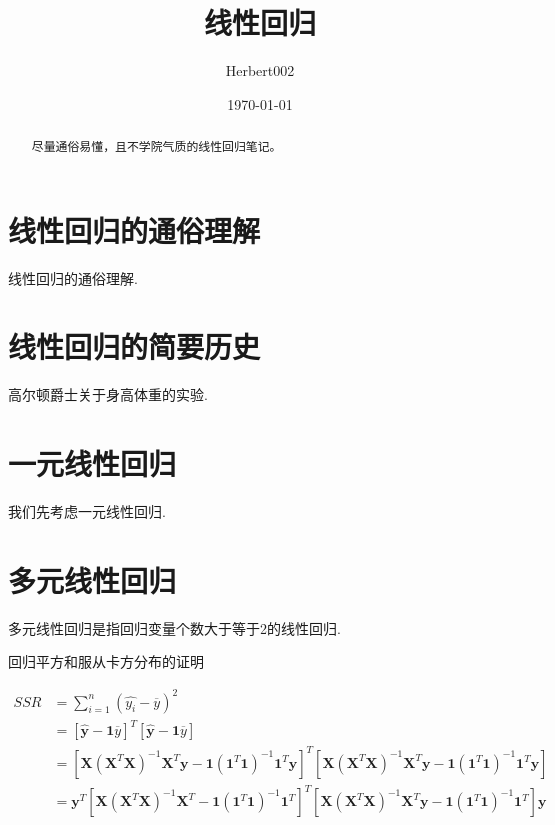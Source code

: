 \documentclass[UTF8]{ctexart}
\title{\heiti 线性回归}
\author{\kaishu Herbert002}
\date{\today}
\begin{document}
	
	\maketitle
	
	\begin{abstract}
		尽量通俗易懂，且不学院气质的线性回归笔记。
	\end{abstract}
	
	\tableofcontents
	
	\section{线性回归的通俗理解}
	线性回归的通俗理解.
	
	\section{线性回归的简要历史}
	高尔顿爵士关于身高体重的实验.
	
	\section{一元线性回归}
	我们先考虑一元线性回归.
	
	\section{多元线性回归}
	多元线性回归是指回归变量个数大于等于2的线性回归.
	
	回归平方和服从卡方分布的证明
	
	\begin{equation}
		\begin{aligned}
			SSR &= \sum_{i=1}^{n} {(\hat{y_{i}} - \overline{y})^2} \\
			    &= [\boldsymbol{\hat{y}} - \boldsymbol{1} \overline{y}]^T [\boldsymbol{\hat{y}} - \boldsymbol{1} \overline{y}] \\
			    &= [\boldsymbol{X} (\boldsymbol{X}^T \boldsymbol{X})^{-1} \boldsymbol{X}^T \boldsymbol{y} - \boldsymbol{1}  (\boldsymbol{1}^T \boldsymbol{1})^{-1} \boldsymbol{1}^T \boldsymbol{y}]^T [\boldsymbol{X} (\boldsymbol{X}^T \boldsymbol{X})^{-1} \boldsymbol{X}^T \boldsymbol{y} - \boldsymbol{1}  (\boldsymbol{1}^T \boldsymbol{1})^{-1} \boldsymbol{1}^T \boldsymbol{y}] \\
			    &= \boldsymbol{y}^T [\boldsymbol{X} (\boldsymbol{X}^T \boldsymbol{X})^{-1} \boldsymbol{X}^T - \boldsymbol{1}  (\boldsymbol{1}^T \boldsymbol{1})^{-1} \boldsymbol{1}^T ]^T [\boldsymbol{X} (\boldsymbol{X}^T \boldsymbol{X})^{-1} \boldsymbol{X}^T \boldsymbol{y} - \boldsymbol{1}  (\boldsymbol{1}^T \boldsymbol{1})^{-1} \boldsymbol{1}^T] \boldsymbol{y} \\
		\end{aligned}
	\end{equation}
\end{document}
